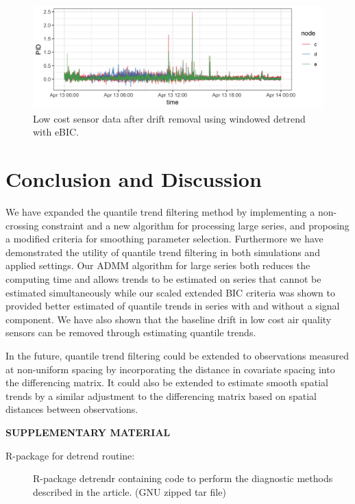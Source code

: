 \documentclass[12pt]{article}
\begin{document}
	\begin{figure}
		\includegraphics[width = \linewidth]{Figures/corrected_data.png}
		\caption{Low cost sensor data after drift removal using windowed detrend with eBIC.}
	\end{figure}

		
	

	\section{Conclusion and Discussion}
	\label{sec:discussion}
	We have expanded the quantile trend filtering method by implementing a non-crossing constraint and a new algorithm for processing large series, and proposing a modified criteria for smoothing parameter selection. Furthermore we have demonstrated the utility of quantile trend filtering in both simulations and applied settings. Our ADMM algorithm for large series both reduces the computing time and allows trends to be estimated on series that cannot be estimated simultaneously while our scaled extended BIC criteria was shown to provided better estimated of quantile trends in series with and without a signal component. We have also shown that the baseline drift in low cost air quality sensors can be removed through estimating quantile trends.
	 
	In the future, quantile trend filtering could be extended to observations measured at non-uniform spacing by incorporating the distance in covariate spacing into the differencing matrix. It could also be extended to estimate smooth spatial trends by a similar adjustment to the differencing matrix based on spatial distances between observations. 
	
	\label{sec:conc}
	
	
	\bigskip
	\begin{center}
		{\large\bf SUPPLEMENTARY MATERIAL}
	\end{center}
	
	\begin{description}
		
		\item[R-package for detrend routine:] R-package detrendr containing code to perform the diagnostic methods described in the article. (GNU zipped tar file)
				
	\end{description}
	
	
	
	
	
\end{document}
